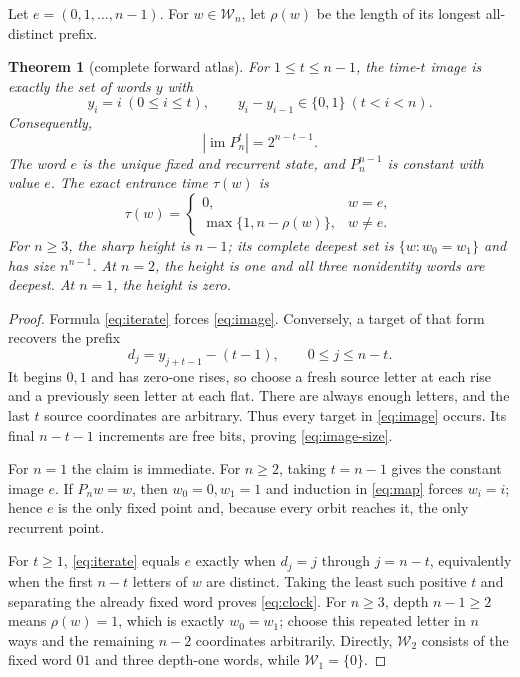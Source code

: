 \documentclass[a4paper,10pt]{amsart}
\newtheorem{theorem}{Theorem}
\theoremstyle{remark}
\newcommand{\W}{\mathcal W}
\newcommand{\im}{\operatorname{im}}
\begin{document}
Let $e=(0,1,\ldots,n-1)$.  For $w\in\W_n$, let $\rho(w)$ be the length of
its longest all-distinct prefix.

\begin{theorem}[complete forward atlas]\label{thm:forward}
For $1\le t\le n-1$, the time-$t$ image is exactly the set of words $y$ with
\begin{equation}\label{eq:image}
 y_i=i\ (0\le i\le t),\qquad
 y_i-y_{i-1}\in\{0,1\}\ (t<i<n).
\end{equation}
Consequently,
\begin{equation}\label{eq:image-size}
                 |\im P_n^t|=2^{n-t-1}.
\end{equation}
The word $e$ is the unique fixed and recurrent state, and $P_n^{n-1}$ is
constant with value $e$.  The exact entrance time $\tau(w)$ is
\begin{equation}\label{eq:clock}
 \tau(w)=
 \begin{cases}
 0,&w=e,\\
 \max\{1,n-\rho(w)\},&w\ne e.
 \end{cases}
\end{equation}
For $n\ge3$, the sharp height is $n-1$; its complete deepest set is
$\{w:w_0=w_1\}$ and has size $n^{n-1}$.  At $n=2$, the height is one and
all three nonidentity words are deepest.  At $n=1$, the height is zero.
\end{theorem}

\begin{proof}
Formula \eqref{eq:iterate} forces \eqref{eq:image}.  Conversely, a target of
that form recovers the prefix
\begin{equation}\label{eq:recover-d}
 d_j=y_{j+t-1}-(t-1),\qquad 0\le j\le n-t.
\end{equation}
It begins $0,1$ and has zero-one rises, so choose a fresh source letter at
each rise and a previously seen letter at each flat.  There are always
enough letters, and the last $t$ source coordinates are arbitrary.  Thus
every target in \eqref{eq:image} occurs.  Its final $n-t-1$ increments are
free bits, proving \eqref{eq:image-size}.

For $n=1$ the claim is immediate.  For $n\ge2$, taking $t=n-1$ gives the
constant image $e$.  If $P_nw=w$, then $w_0=0,w_1=1$ and induction in
\eqref{eq:map} forces $w_i=i$; hence $e$ is the only fixed point and, because
every orbit reaches it, the only recurrent point.

For $t\ge1$, \eqref{eq:iterate} equals $e$ exactly when
$d_j=j$ through $j=n-t$, equivalently when the first $n-t$ letters of $w$
are distinct.  Taking the least such positive $t$ and separating the already
fixed word proves \eqref{eq:clock}.  For $n\ge3$, depth $n-1\ge2$ means
$\rho(w)=1$, which is exactly $w_0=w_1$; choose this repeated letter in $n$
ways and the remaining $n-2$ coordinates arbitrarily.  Directly, $\W_2$
consists of the fixed word $01$ and three depth-one words, while
$\W_1=\{0\}$.
\end{proof}
\end{document}
